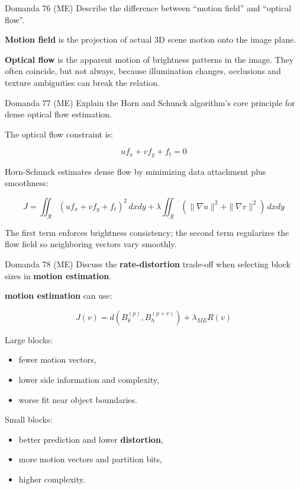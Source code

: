 \begin{questionbox}{Domanda 76}
(ME) Describe the difference between “motion field” and “optical flow”.
\end{questionbox}


\textbf{Motion field} is the projection of actual 3D scene motion onto the image plane.

\textbf{Optical flow} is the apparent motion of brightness patterns in the image. They often coincide, but not always, because illumination changes, occlusions and texture ambiguities can break the relation.



\begin{questionbox}{Domanda 77}
(ME) Explain the Horn and Schunck algorithm’s core principle for dense optical flow estimation.
\end{questionbox}


The optical flow constraint is:


$$
u f_x + v f_y + f_t = 0
$$


Horn-Schunck estimates dense flow by minimizing data attachment plus smoothness:


$$
J=
\iint_{\mathcal{R}}(u f_x+v f_y+f_t)^2\,dxdy
+\lambda\iint_{\mathcal{R}}(\|\nabla u\|^2+\|\nabla v\|^2)\,dxdy
$$


The first term enforces brightness consistency; the second term regularizes the flow field so neighboring vectors vary smoothly.



\begin{questionbox}{Domanda 78}
(ME) Discuss the \textbf{\textbf{rate}-\textbf{distortion}} trade-off when selecting block sizes in \textbf{motion estimation}.
\end{questionbox}


\textbf{motion estimation} can use:


$$
J(v)=d(B_k^{(p)},B_h^{(p+v)})+\lambda_{ME}R(v)
$$


Large blocks:

\begin{itemize}
  \item fewer motion vectors,
  \item lower side information and complexity,
  \item worse fit near object boundaries.
\end{itemize}

Small blocks:

\begin{itemize}
  \item better prediction and lower \textbf{distortion},
  \item more motion vectors and partition bits,
  \item higher complexity.
\end{itemize}



